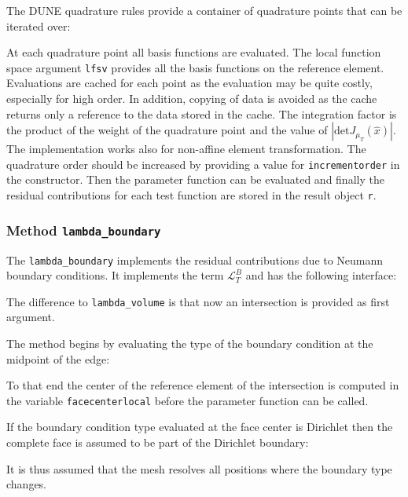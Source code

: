 \documentclass[a4paper,12pt]{article}
\begin{document}
The DUNE quadrature rules provide a container of quadrature points that
can be iterated over:

At each quadrature point all basis functions are evaluated. The local
function space argument \lstinline{lfsv} provides all the basis functions on the
reference element. Evaluations are cached for each point as the evaluation
may be quite costly, especially for high order. In addition, copying of data is
avoided as the cache returns only a reference to the data stored in the cache.
The integration factor is the product of the weight of the quadrature point
and the value of $|\text{det} J_{\mu_T}(\hat x)|$. The implementation works also
for non-affine element transformation. The quadrature order should be increased
by providing a value for \lstinline{incrementorder} in the constructor.
Then the parameter function can be evaluated and finally the
residual contributions for each test function are stored in the result object \lstinline{r}.

\subsubsection*{Method \lstinline{lambda_boundary}}

The \lstinline{lambda_boundary} implements the residual
contributions due to Neumann boundary conditions. 
It implements the term $\mathcal{L}_T^B$ and has the following interface:

The difference to \lstinline{lambda_volume} is that now an intersection is
provided as first argument.

The method begins by evaluating the type of the boundary condition at the
midpoint of the edge:

To that end the center of the reference element of the intersection
is computed in the variable \lstinline{facecenterlocal} before the parameter function
can be called.

If the boundary condition type evaluated at the face center is Dirichlet
then the complete face is assumed to be part of the Dirichlet boundary:

It is thus assumed that the mesh resolves all positions where the boundary type
changes.
\end{document}

